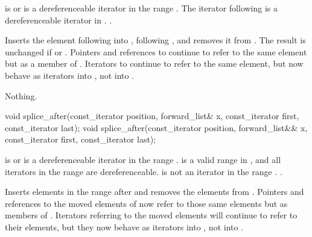 \begin{itemdescr}
\pnum
\requires {} is  or is a dereferenceable
iterator in the range .
The iterator following  is a dereferenceable iterator in .
.

\pnum
\effects Inserts the element following  into , following
, and removes it from .
The result is unchanged if  or . Pointers
and references to  continue to refer to the same element but as a member of
. Iterators to  continue to refer to
the same element, but now behave as iterators into , not into .

\pnum
\throws Nothing.

\pnum
\complexity {}
\end{itemdescr}

%
%
\begin{itemdecl}
void splice_after(const_iterator position, forward_list& x,
                  const_iterator first, const_iterator last);
void splice_after(const_iterator position, forward_list&& x,
                  const_iterator first, const_iterator last);
\end{itemdecl}

\begin{itemdescr}
\pnum
\requires {} is  or is a
dereferenceable iterator in the range .  is a
valid range in , and all iterators in the range  are
dereferenceable.  is not an iterator in the range .
.

\pnum
\effects Inserts elements in the range  after  and
removes the elements from . Pointers and references to the moved elements of
 now refer to those same elements but as members of . Iterators
referring to the moved elements will continue to refer to their elements, but they now
behave as iterators into , not into .

\pnum
\complexity {}
\end{itemdescr}

